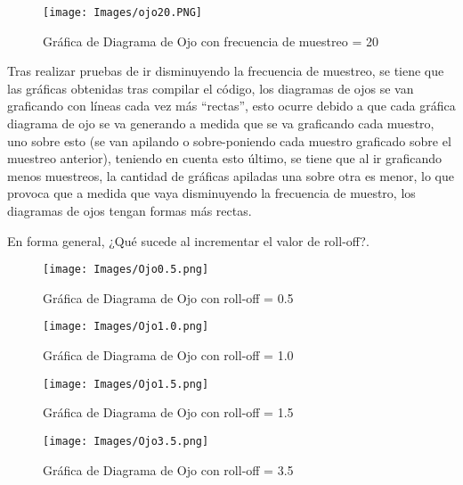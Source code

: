 \documentclass[lettersize,journal]{IEEEtran}
\begin{document}
\begin{figure}[h!]
    \centering
    \texttt{[image: Images/ojo20.PNG]}
    \caption{Gráfica de Diagrama de Ojo con frecuencia de muestreo = 20}
    \label{fig:my_label}
\end{figure}
\newpage

Tras realizar pruebas de ir disminuyendo la frecuencia de muestreo, se tiene que las gráficas obtenidas tras compilar el código, los diagramas de ojos se van graficando con líneas cada vez más ``rectas'', esto ocurre debido a que cada gráfica diagrama de ojo se va generando a medida que se va graficando cada muestro, uno sobre esto (se van apilando o sobre-poniendo cada muestro graficado sobre el muestreo anterior), teniendo en cuenta esto último, se tiene que al ir graficando menos muestreos, la cantidad de gráficas apiladas una sobre otra es menor, lo que provoca que a medida que vaya disminuyendo la frecuencia de muestro, los diagramas de ojos tengan formas más rectas. 

\newpage

En forma general, ¿Qué sucede al incrementar el valor de roll-off?.\\
\begin{figure}[h!]
    \centering
    \texttt{[image: Images/Ojo0.5.png]}
    \caption{Gráfica de Diagrama de Ojo con roll-off = 0.5}
    \label{fig:my_label}
\end{figure}

\begin{figure}[h!]
    \centering
    \texttt{[image: Images/Ojo1.0.png]}
    \caption{Gráfica de Diagrama de Ojo con roll-off = 1.0}
    \label{fig:my_label}
\end{figure}

\begin{figure}[h!]
    \centering
    \texttt{[image: Images/Ojo1.5.png]}
    \caption{Gráfica de Diagrama de Ojo con roll-off = 1.5}
    \label{fig:my_label}
\end{figure}

\begin{figure}[h!]
    \centering
    \texttt{[image: Images/Ojo3.5.png]}
    \caption{Gráfica de Diagrama de Ojo con roll-off = 3.5}
    \label{fig:my_label}
\end{figure}


\end{document}
